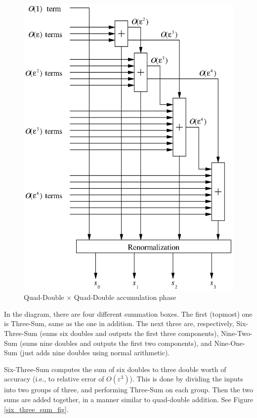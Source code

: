 \documentclass[11pt]{article}
\theoremstyle{definition}
\newcommand{\eps}{\varepsilon}
\begin{document}
\begin{figure}
  \begin{center} 
    \includegraphics{qd_mul_accum.eps}
    \caption{\label{qd_mul_accum_fig}Quad-Double $\times$ Quad-Double accumulation phase}
  \end{center}
\end{figure}

In the diagram, there are four different summation boxes.
The first (topmost) one is {\sc Three-Sum}, same as the one in 
addition.  The next three are, respectively, {\sc Six-Three-Sum}
(sums six doubles and outputs the first three components), 
{\sc Nine-Two-Sum} (sums nine doubles and outputs the first two components), 
and {\sc Nine-One-Sum} (just adds nine doubles using normal arithmetic).

{\sc Six-Three-Sum} computes the sum of six doubles to three double
worth of accuracy (i.e., to relative error of $O(\eps^3)$).  This is
done by dividing the inputs into two groups of three, and 
performing {\sc Three-Sum} on each group.  Then the two sums
are added together, in a manner similar to quad-double addition.
See Figure \ref{six_three_sum_fig}.
\end{document}
